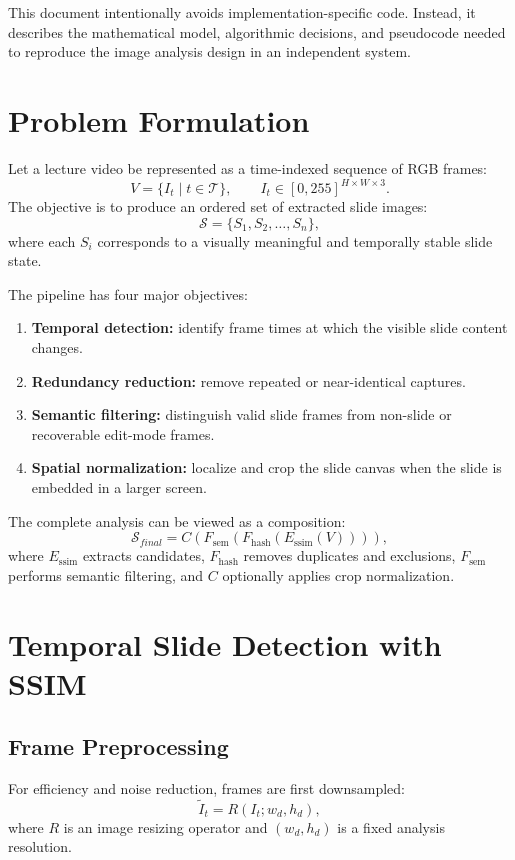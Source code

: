 \documentclass[11pt]{article}
\begin{document}
This document intentionally avoids implementation-specific code. Instead, it describes the mathematical model, algorithmic decisions, and pseudocode needed to reproduce the image analysis design in an independent system.

\section{Problem Formulation}

Let a lecture video be represented as a time-indexed sequence of RGB frames:
\[
V = \{I_t \mid t \in \mathcal{T}\}, \qquad I_t \in [0,255]^{H \times W \times 3}.
\]
The objective is to produce an ordered set of extracted slide images:
\[
\mathcal{S} = \{S_1, S_2, \ldots, S_n\},
\]
where each $S_i$ corresponds to a visually meaningful and temporally stable slide state.

The pipeline has four major objectives:
\begin{enumerate}
  \item \textbf{Temporal detection:} identify frame times at which the visible slide content changes.
  \item \textbf{Redundancy reduction:} remove repeated or near-identical captures.
  \item \textbf{Semantic filtering:} distinguish valid slide frames from non-slide or recoverable edit-mode frames.
  \item \textbf{Spatial normalization:} localize and crop the slide canvas when the slide is embedded in a larger screen.
\end{enumerate}

The complete analysis can be viewed as a composition:
\[
\mathcal{S}_{final}
= C\left(
F_{\text{sem}}\left(
F_{\text{hash}}\left(
E_{\text{ssim}}(V)
\right)\right)\right),
\]
where $E_{\text{ssim}}$ extracts candidates, $F_{\text{hash}}$ removes duplicates and exclusions, $F_{\text{sem}}$ performs semantic filtering, and $C$ optionally applies crop normalization.

\section{Temporal Slide Detection with SSIM}

\subsection{Frame Preprocessing}

For efficiency and noise reduction, frames are first downsampled:
\[
\tilde{I}_t = R(I_t; w_d, h_d),
\]
where $R$ is an image resizing operator and $(w_d,h_d)$ is a fixed analysis resolution.
\end{document}
